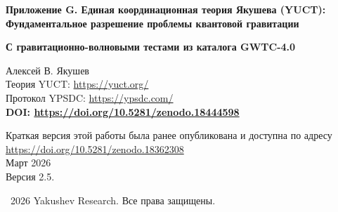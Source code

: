 \documentclass[12pt,a4paper]{article}
\theoremstyle{remark}
\newcommand{\Keff}{K_{\mathrm{eff}}}
\begin{document}
	
	\begin{titlepage}
		\begin{center}
			\vspace*{0cm}
			
			\Huge\textbf{Приложение G. Единая координационная теория Якушева (YUCT): \\ Фундаментальное разрешение проблемы квантовой гравитации}
			
			\vspace{0.5cm}
			\Large\textbf{С гравитационно-волновыми тестами из каталога GWTC-4.0}
			
			\vspace{1cm}
			\Large
			Алексей В. Якушев\\
			
			Теория YUCT: \url{https://yuct.org/}\\
			Протокол YPSDC: \url{https://ypsdc.com/}\\
			
			\vspace{1cm}
			\textbf{DOI: \url{https://doi.org/10.5281/zenodo.18444598}}\\
			
			\vspace{1cm}
			
			\vspace{0cm}
			\large 
			Краткая версия этой работы была ранее опубликована и доступна по адресу\\ \url{https://doi.org/10.5281/zenodo.18362308}\\
			\vspace{1cm}
			Март 2026 \\ \large Версия 2.5.
			
			\vspace{3cm}
			\textcopyright~2026 Yakushev Research. Все права защищены.
			
			\newpage
			
			\begin{abstract}
				\noindent
				В данной работе представлена полная математическая формулировка Единой координационной теории Якушева (YUCT) как окончательное решение проблемы квантовой гравитации. В отличие от традиционных подходов, пытающихся квантовать пространство-время или гравитоны, YUCT постулирует, что как квантовая механика, так и общая теория относительности возникают из более фундаментального принципа \emph{координации}. Мы разрабатываем: (1) 19-мерную геометрическую структуру с полями координации $\Psi_{MN}$, (2) Триаду D+I•R как онтологическую основу, (3) Полный лагранжиан $\mathcal{L}_{\text{YUCT}}$, объединяющий все физические взаимодействия через эффективность координации $\Keff$, (4) Вывод квантовой динамики и гравитационной геометрии как предельных случаев, (5) Конкретные предсказания для квантово-гравитационных явлений, проверяемых на лабораторных и астрофизических масштабах. Теория устраняет концептуальные противоречия между квантовой нелокальностью и релятивистской причинностью, даёт естественное объяснение тёмной энергии и тёмной материи и предлагает математически согласованную структуру, в которой «проблема квантовой гравитации» растворяется в общей теории координированных систем.
				

\end{abstract}
\end{center}
\end{titlepage}
\end{document}
